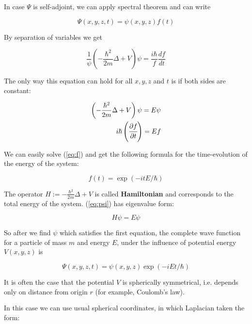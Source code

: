 \documentclass[11pt, a4paper, german]{article}
\theoremstyle{plain}
\theoremstyle{definition}
\theoremstyle{remark}
\numberwithin{equation}{section}
\numberwithin{theorem}{section}
\begin{document}
In case $\Psi$ is self-adjoint, we can apply spectral theorem and can write

\begin{equation} \label{eq:wave-function-separation}
\Psi(x,y,z,t) = \psi(x,y,z) f(t)
\end{equation}

By separation of variables we get 

\begin{equation} \label{eq:schroedinger-after-separation}
\frac{1}{\psi}\left(- \frac{\hbar^2}{2m}\Delta + V\right)\psi = \frac{i\hbar}{f}\frac{df}{dt}
\end{equation}

The only way this equation can hold for all $x,y,z$ and $t$ is if both sides are constant:

\begin{align} 
\left(- \frac{\hbar^2}{2m}\Delta + V\right)\psi = E \psi \label{eq:psi}\\
i\hbar \left(\cfrac{\partial f}{\partial t} \right) = Ef \label{eq:f}
\end{align}

We can easily solve (\ref{eq:f}) and get the following formula for the time-evolution of the energy of the system: 

\begin{equation} \label{eq:time-evolution}
f(t) = \exp(-itE/\hbar)
\end{equation}

The operator $H:= - \frac{\hbar^2}{2m}\Delta + V$ is called \textbf{Hamiltonian} and corresponds to the total energy of the system. (\ref{eq:psi}) has eigenvalue form: 

\begin{equation} \label{eq:schroedinger-eigenvalue-form}
H\psi = E\psi
\end{equation}

So after we find $\psi$ which satisfies the first equation, the complete wave function for a particle of mass $m$ and energy $E$, under the influence of potential energy $V(x,y,z)$ is 

\begin{equation}
\Psi(x,y,z,t) = \psi(x,y,z)\exp(-iEt/\hbar)
\end{equation}

It is often the case that the potential $V$ is spherically symmetrical, i.e. depends only on distance from origin $r$ (for example, Coulomb's law).

In this case we can use usual spherical coordinates, in which Laplacian taken the form:
\end{document}
